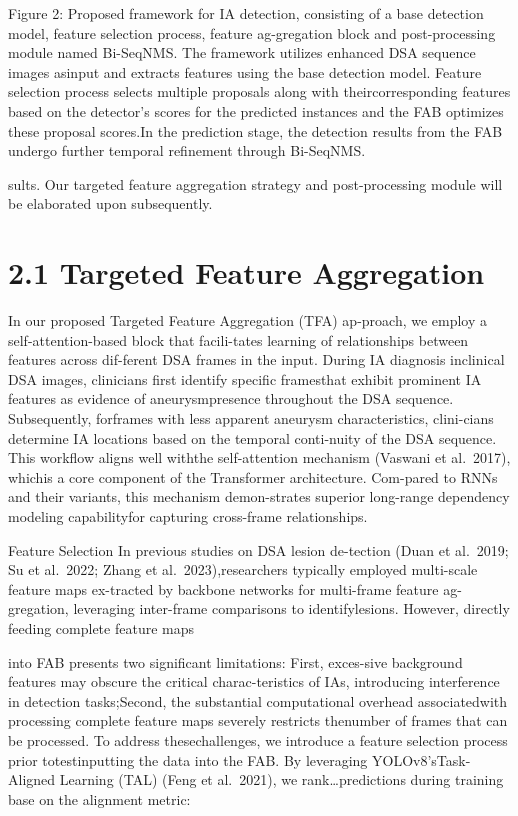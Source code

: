 \documentclass[
  10
]{article}
\begin{document}
Figure 2: Proposed framework for IA detection, consisting of a base
detection model, feature selection process, feature ag-gregation block
and post-processing module named Bi-SeqNMS. The framework utilizes
enhanced DSA sequence images asinput and extracts features using the
base detection model. Feature selection process selects multiple
proposals along with theircorresponding features based on the detector's
scores for the predicted instances and the FAB optimizes these proposal
scores.In the prediction stage, the detection results from the FAB
undergo further temporal refinement through Bi-SeqNMS.

sults. Our targeted feature aggregation strategy and post-processing
module will be elaborated upon subsequently.

\section{2.1 Targeted Feature
Aggregation}\label{targeted-feature-aggregation}

In our proposed Targeted Feature Aggregation (TFA) ap-proach, we employ
a self-attention-based block that facili-tates learning of relationships
between features across dif-ferent DSA frames in the input. During IA
diagnosis inclinical DSA images, clinicians first identify specific
framesthat exhibit prominent IA features as evidence of aneurysmpresence
throughout the DSA sequence. Subsequently, forframes with less apparent
aneurysm characteristics, clini-cians determine IA locations based on
the temporal conti-nuity of the DSA sequence. This workflow aligns well
withthe self-attention mechanism (Vaswani et al.~2017), whichis a core
component of the Transformer architecture. Com-pared to RNNs and their
variants, this mechanism demon-strates superior long-range dependency
modeling capabilityfor capturing cross-frame relationships.

Feature Selection In previous studies on DSA lesion de-tection (Duan et
al.~2019; Su et al.~2022; Zhang et al.~2023),researchers typically
employed multi-scale feature maps ex-tracted by backbone networks for
multi-frame feature ag-gregation, leveraging inter-frame comparisons to
identifylesions. However, directly feeding complete feature maps

into FAB presents two significant limitations: First, exces-sive
background features may obscure the critical charac-teristics of IAs,
introducing interference in detection tasks;Second, the substantial
computational overhead associatedwith processing complete feature maps
severely restricts thenumber of frames that can be processed. To address
thesechallenges, we introduce a feature selection process prior
totestinputting the data into the FAB. By leveraging
YOLOv8'sTask-Aligned Learning (TAL) (Feng et al.~2021), we
rank\ldots predictions during training base on the alignment metric:
\end{document}
